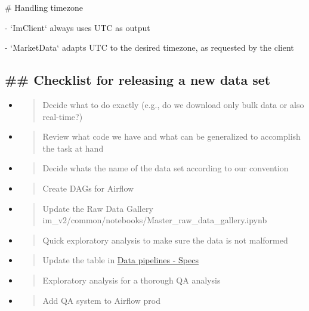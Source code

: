 \documentclass[11pt, reqno]{amsart}
\begin{document}
\# Handling timezone

- `ImClient` always uses UTC as output

- `MarketData` adapts UTC to the desired timezone, as requested by the
client

\hypertarget{checklist-for-releasing-a-new-data-set}{%
\subsection{\#\# Checklist for releasing a new data
set}\label{checklist-for-releasing-a-new-data-set}}

\begin{itemize}
\item
  \begin{quote}
  Decide what to do exactly (e.g., do we download only bulk data or also
  real-time?)
  \end{quote}
\item
  \begin{quote}
  Review what code we have and what can be generalized to accomplish the
  task at hand
  \end{quote}
\item
  \begin{quote}
  Decide what\textquotesingle s the name of the data set according to
  our convention
  \end{quote}
\item
  \begin{quote}
  Create DAGs for Airflow
  \end{quote}
\item
  \begin{quote}
  Update the Raw Data Gallery
  im\_v2/common/notebooks/Master\_raw\_data\_gallery.ipynb
  \end{quote}
\item
  \begin{quote}
  Quick exploratory analysis to make sure the data is not malformed
  \end{quote}
\item
  \begin{quote}
  Update the table in
  \href{https://docs.google.com/document/d/1nLhaFBSHVrexCcwJMnpXlkqwn0l6bDiVer34GKVclYY/edit\#heading=h.8g5ajvlq6zks}{\ul{Data
  pipelines - Specs}}
  \end{quote}
\item
  \begin{quote}
  Exploratory analysis for a thorough QA analysis
  \end{quote}
\item
  \begin{quote}
  Add QA system to Airflow prod
  \end{quote}
\end{itemize}
\end{document}
